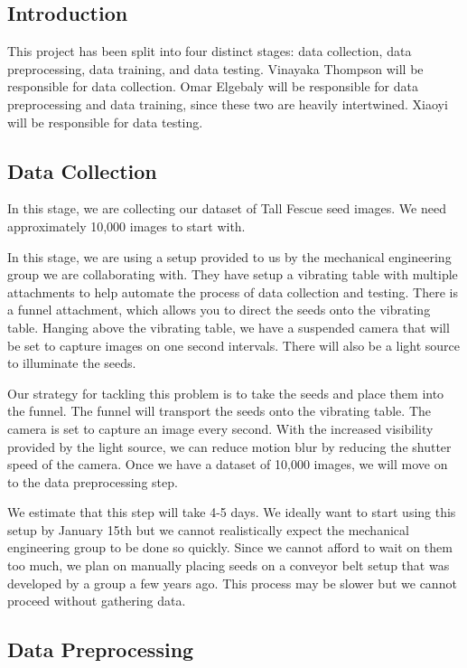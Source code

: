 \documentclass[onecolumn, draftclsnofoot,10pt, compsoc]{IEEEtran}
\begin{document}
\subsection{Introduction}

This project has been split into four distinct stages: data collection, data preprocessing, data training, and data testing. Vinayaka Thompson will be responsible for data collection. Omar Elgebaly will be responsible for data preprocessing and data training, since these two are heavily intertwined. Xiaoyi will be responsible for data testing. 

\subsection{Data Collection}
In this stage, we are collecting our dataset of Tall Fescue seed images. We need approximately 10,000 images to start with. 

In this stage, we are using a setup provided to us by the mechanical engineering group we are collaborating with. They have setup a vibrating table with multiple attachments to help automate the process of data collection and testing. There is a funnel attachment, which allows you to direct the seeds onto the vibrating table. Hanging above the vibrating table, we have a suspended camera that will be set to capture images on one second intervals. There will also be a light source to illuminate the seeds.

Our strategy for tackling this problem is to take the seeds and place them into the funnel. The funnel will transport the seeds onto the vibrating table. The camera is set to capture an image every second. With the increased visibility provided by the light source, we can reduce motion blur by reducing the shutter speed of the camera. Once we have a dataset of 10,000 images, we will move on to the data preprocessing step. 

We estimate that this step will take 4-5 days. We ideally want to start using this setup by January 15th but we cannot realistically expect the mechanical engineering group to be done so quickly. Since we cannot afford to wait on them too much, we plan on manually placing seeds on a conveyor belt setup that was developed by a group a few years ago. This process may be slower but we cannot proceed without gathering data. 

\subsection{Data Preprocessing}
\end{document}
